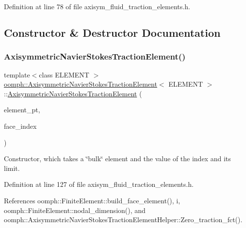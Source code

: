 Definition at line 78 of file axisym\+\_\+fluid\+\_\+traction\+\_\+elements.\+h.



\subsection{Constructor \& Destructor Documentation}
\mbox{\label{classoomph_1_1AxisymmetricNavierStokesTractionElement_a8e0d081107ea8ad2e68db11abaf27ebc}} 
\subsubsection{\texorpdfstring{Axisymmetric\+Navier\+Stokes\+Traction\+Element()}{AxisymmetricNavierStokesTractionElement()}}
{\footnotesize\ttfamily template$<$class E\+L\+E\+M\+E\+NT $>$ \\
\hyperlink{classoomph_1_1AxisymmetricNavierStokesTractionElement}{oomph\+::\+Axisymmetric\+Navier\+Stokes\+Traction\+Element}$<$ E\+L\+E\+M\+E\+NT $>$\+::\hyperlink{classoomph_1_1AxisymmetricNavierStokesTractionElement}{Axisymmetric\+Navier\+Stokes\+Traction\+Element} (\begin{DoxyParamCaption}\item[{\hyperlink{classoomph_1_1FiniteElement}{Finite\+Element} $\ast$const \&}]{element\+\_\+pt,  }\item[{const int \&}]{face\+\_\+index }\end{DoxyParamCaption})\hspace{0.3cm}{\ttfamily [inline]}}



Constructor, which takes a \char`\"{}bulk\char`\"{} element and the value of the index and its limit. 



Definition at line 127 of file axisym\+\_\+fluid\+\_\+traction\+\_\+elements.\+h.



References oomph\+::\+Finite\+Element\+::build\+\_\+face\+\_\+element(), i, oomph\+::\+Finite\+Element\+::nodal\+\_\+dimension(), and oomph\+::\+Axisymmetric\+Navier\+Stokes\+Traction\+Element\+Helper\+::\+Zero\+\_\+traction\+\_\+fct().



